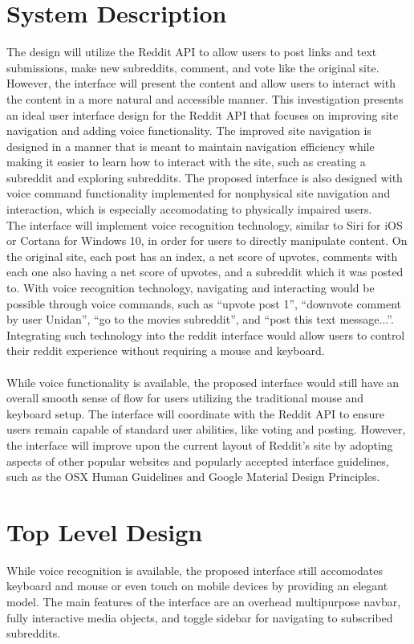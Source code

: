 \documentclass{article}
\begin{document}
\section{System Description} The design will utilize the Reddit API to allow users to post links and text submissions, make new subreddits, comment, and vote like the original site. However, the interface will present the content and allow users to interact with the content in a more natural and accessible manner. This investigation presents an ideal user interface design for the Reddit API that focuses on improving site navigation and adding voice functionality. The improved site navigation is designed in a manner that is meant to maintain navigation efficiency while making it easier to learn how to interact with the site, such as creating a subreddit and exploring subreddits. The proposed interface is also designed with voice command functionality implemented for nonphysical site navigation and interaction, which is especially accomodating to physically impaired users. 
\\
\indent The interface will implement voice recognition technology, similar to Siri for iOS or Cortana for Windows 10, in order for users to directly manipulate content. On the original site, each post has an index, a net score of upvotes, comments with each one also having a net score of upvotes, and a subreddit which it was posted to. With voice recognition technology, navigating and interacting would be possible through voice commands, such as ``upvote post 1'', ``downvote comment by user Unidan'', ``go to the movies subreddit'', and ``post this text message...''. Integrating such technology into the reddit interface would allow users to control their reddit experience without requiring a mouse and keyboard.\\
\\
\indent While voice functionality is available, the proposed interface would still have an overall smooth sense of flow for users utilizing the traditional mouse and keyboard setup. The interface will coordinate with the Reddit API to ensure users remain capable of standard user abilities, like voting and posting. However, the interface will improve upon the current layout of Reddit's site by adopting aspects of other popular websites and popularly accepted interface guidelines, such as the OSX Human Guidelines and Google Material Design Principles.

\section{Top Level Design} While voice recognition is available, the proposed interface still accomodates keyboard and mouse or even touch on mobile devices by providing an elegant model. The main features of the interface are an overhead multipurpose navbar, fully interactive media objects, and toggle sidebar for navigating to subscribed subreddits.
\end{document}
